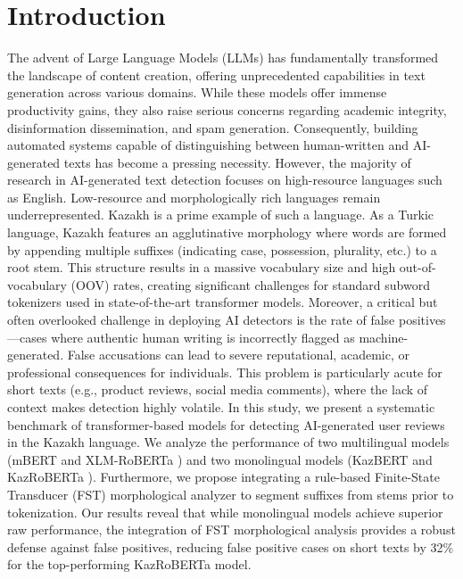 \documentclass[runningheads]{llncs}
\begin{document}
\section{Introduction}
The advent of Large Language Models (LLMs) has fundamentally transformed the landscape of content creation, offering unprecedented capabilities in text generation across various domains. While these models offer immense productivity gains, they also raise serious concerns regarding academic integrity, disinformation dissemination, and spam generation. Consequently, building automated systems capable of distinguishing between human-written and AI-generated texts has become a pressing necessity.
However, the majority of research in AI-generated text detection focuses on high-resource languages such as English. Low-resource and morphologically rich languages remain underrepresented. Kazakh is a prime example of such a language. As a Turkic language, Kazakh features an agglutinative morphology where words are formed by appending multiple suffixes (indicating case, possession, plurality, etc.) to a root stem. This structure results in a massive vocabulary size and high out-of-vocabulary (OOV) rates, creating significant challenges for standard subword tokenizers used in state-of-the-art transformer models.
Moreover, a critical but often overlooked challenge in deploying AI detectors is the rate of false positives---cases where authentic human writing is incorrectly flagged as machine-generated. False accusations can lead to severe reputational, academic, or professional consequences for individuals. This problem is particularly acute for short texts (e.g., product reviews, social media comments), where the lack of context makes detection highly volatile.
In this study, we present a systematic benchmark of transformer-based models for detecting AI-generated user reviews in the Kazakh language. We analyze the performance of two multilingual models (mBERT \cite{2} and XLM-RoBERTa \cite{3}) and two monolingual models (KazBERT \cite{4} and KazRoBERTa \cite{5}). Furthermore, we propose integrating a rule-based Finite-State Transducer (FST) morphological analyzer \cite{6} to segment suffixes from stems prior to tokenization. Our results reveal that while monolingual models achieve superior raw performance, the integration of FST morphological analysis provides a robust defense against false positives, reducing false positive cases on short texts by 32\% for the top-performing KazRoBERTa model.
\end{document}

